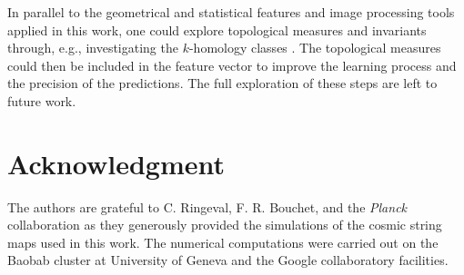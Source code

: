 \documentclass[fleqn,usenatbib]{mnras}
\newcommand{\ali}[1]{{\textcolor{red}{#1}}}
\begin{document}
%
In parallel to the geometrical and statistical features and image processing tools applied in this work, one could 
 explore topological measures and invariants through, e.g., investigating the $k$-homology classes
\citep{matsubara2003statistics,adler1981geometry,adler2011topological,adler2010persistent,kozlov2007combinatorial,bubenik2015statistical}.
The topological measures could then be included in the feature vector to improve the learning process and the precision of the predictions. The full exploration of these steps are left to future work.




\section*{Acknowledgment}
The authors are grateful to  C. Ringeval, F. R. Bouchet, and the {\it Planck} collaboration as they generously provided the simulations of the cosmic string maps used in this work.
The numerical computations were carried out on the Baobab cluster at University of Geneva and the Google collaboratory facilities.



\bsp	%
\label{lastpage}
\end{document}

